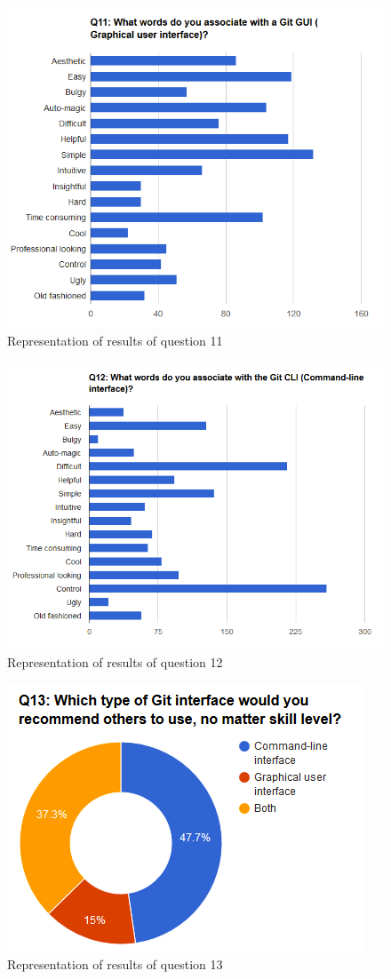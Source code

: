 \documentclass[a4paper,oneside]{bth} %
\begin{document}
			\begin{figure}[H]
				\centering
				\includegraphics[width=0.8\linewidth]{graphs/q11.png}
				\caption{Representation of results of question 11}
				\label{fig:q11}
			\end{figure}
			\begin{figure}[H]
				\centering
				\includegraphics[width=0.8\linewidth]{graphs/q12.png}
				\caption{Representation of results of question 12}
				\label{fig:q12}
			\end{figure}
			\begin{figure}[H]
				\centering
				\includegraphics[width=0.5\linewidth]{graphs/q13.png}
				\caption{Representation of results of question 13}
				\label{fig:q13}
			\end{figure}
\end{document}
